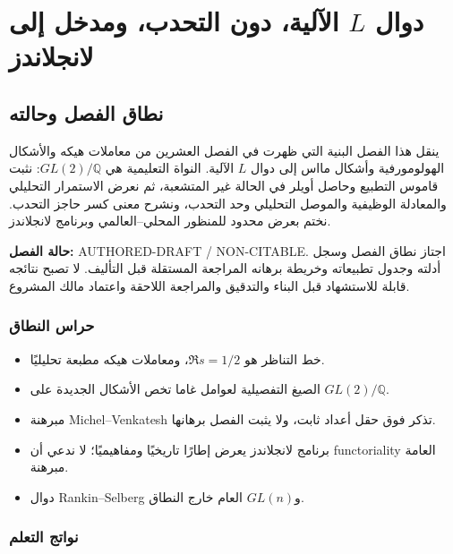 \chapter{دوال \(L\) الآلية، دون التحدب، ومدخل إلى لانجلاندز}
\label{ch:automorphic-l-subconvexity-langlands}

\section*{نطاق الفصل وحالته}

ينقل هذا الفصل البنية التي ظهرت في الفصل العشرين من معاملات هيكه
والأشكال الهولومورفية وأشكال مااس إلى دوال \(L\) الآلية. النواة
التعليمية هي \(GL(2)/\mathbb Q\): نثبت قاموس التطبيع وحاصل أويلر في
الحالة غير المتشعبة، ثم نعرض الاستمرار التحليلي والمعادلة الوظيفية
والموصل التحليلي وحد التحدب، ونشرح معنى كسر حاجز التحدب. نختم بعرض
محدود للمنظور المحلي--العالمي وبرنامج لانجلاندز.

\noindent\textbf{حالة الفصل:}
\textenglish{AUTHORED-DRAFT / NON-CITABLE}. اجتاز نطاق الفصل وسجل
أدلته وجدول تطبيعاته وخريطة برهانه المراجعة المستقلة قبل التأليف. لا
تصبح نتائجه قابلة للاستشهاد قبل البناء والتدقيق والمراجعة اللاحقة
واعتماد مالك المشروع.

\subsection*{حراس النطاق}

\begin{itemize}
  \item خط التناظر هو \(\Re s=1/2\)، ومعاملات هيكه مطبعة تحليليًا.
  \item الصيغ التفصيلية لعوامل غاما تخص الأشكال الجديدة على
  \(GL(2)/\mathbb Q\).
  \item مبرهنة Michel--Venkatesh تذكر فوق حقل أعداد ثابت، ولا يثبت
  الفصل برهانها.
  \item برنامج لانجلاندز يعرض إطارًا تاريخيًا ومفاهيميًا؛ لا ندعي أن
  \textenglish{functoriality} العامة مبرهنة.
  \item دوال Rankin--Selberg و\(GL(n)\) العام خارج النطاق.
\end{itemize}

\subsection*{نواتج التعلم}

